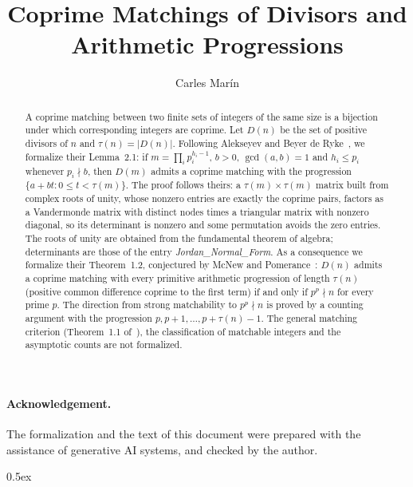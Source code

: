 \documentclass[10pt,a4paper]{article}
\begin{document}
\title{Coprime Matchings of Divisors and Arithmetic Progressions}
\author{Carles Mar\'in}
\maketitle

\begin{abstract}
A coprime matching between two finite sets of integers of the same size is a bijection under which corresponding
integers are coprime. Let $D(n)$ be the set of positive divisors of $n$ and $\tau(n)=|D(n)|$. Following Alekseyev and
Beyer de Ryke~\cite{AlekseyevBeyerDeRyke2026}, we formalize their Lemma~2.1: if $m=\prod_i p_i^{h_i-1}$, $b>0$,
$\gcd(a,b)=1$ and $h_i\le p_i$ whenever $p_i\nmid b$, then $D(m)$ admits a coprime matching with the progression
$\{a+bt: 0\le t<\tau(m)\}$. The proof follows theirs: a $\tau(m)\times\tau(m)$ matrix built from complex roots of
unity, whose nonzero entries are exactly the coprime pairs, factors as a Vandermonde matrix with distinct nodes times a
triangular matrix with nonzero diagonal, so its determinant is nonzero and some permutation avoids the zero entries.
The roots of unity are obtained from the fundamental theorem of algebra; determinants are those of the entry
\emph{Jordan\_Normal\_Form}. As a consequence we formalize their Theorem~1.2, conjectured by McNew and
Pomerance~\cite{McNewPomerance2026}: $D(n)$ admits a coprime matching with every primitive arithmetic progression of
length $\tau(n)$ (positive common difference coprime to the first term) if and only if $p^p\nmid n$ for every prime
$p$. The direction from strong matchability to $p^p\nmid n$ is proved by a counting argument with the progression $p, p+1, \dots, p+\tau(n)-1$.
The general matching criterion (Theorem~1.1 of~\cite{AlekseyevBeyerDeRyke2026}), the classification of matchable
integers and the asymptotic counts are not formalized.
\end{abstract}

\paragraph{Acknowledgement.} The formalization and the text of this document were prepared with the
assistance of generative AI systems, and checked by the author.

\tableofcontents

\parindent 0pt\parskip 0.5ex





\end{document}
